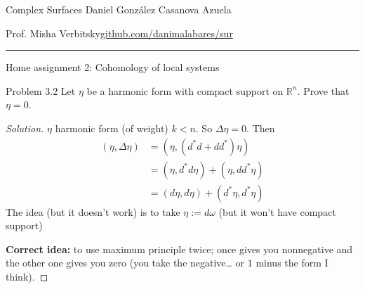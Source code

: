 
\setcounter{secnumdepth}{2}



\begin{minipage}{\textwidth}
	\begin{minipage}{1\textwidth}
		Complex Surfaces \hfill Daniel González Casanova Azuela
		
		{\small Prof. Misha Verbitsky\hfill\href{https://github.com/danimalabares/sur}{github.com/danimalabares/sur}}
	\end{minipage}
\end{minipage}\vspace{.2cm}\hrule

\vspace{10pt}
{\huge Home assignment 2: Cohomology of local systems}

\begin{thing1}{Problem 3.2}\label{prob:3.2}\leavevmode
Let  \(\eta\) be a harmonic form with compact support on \(\mathbb{R}^n\). Prove that \(\eta=0\).
\end{thing1}

\begin{proof}[Solution]\leavevmode
\(\eta\) harmonic form (of weight) \(k<n\). So \(\Delta \eta=0\). Then
\begin{align*}
	(\eta,\Delta\eta)&=(\eta,(d^*d+d d^*)\eta)\\
	&=(\eta,d^*d\eta)+(\eta,d d^*\eta)\\
	&=(d\eta,d\eta)+(d^*\eta,d^*\eta)
\end{align*}
{\color{3}The idea (but it doesn't work)} is to take \(\eta:=d\omega\) {\color{4}(but it won't have compact support)}


\textbf{Correct idea:} to use maximum principle twice; once gives you nonnegative and the other one gives you zero (you take the negative… or \(1\) minus the form I think).
\end{proof}


